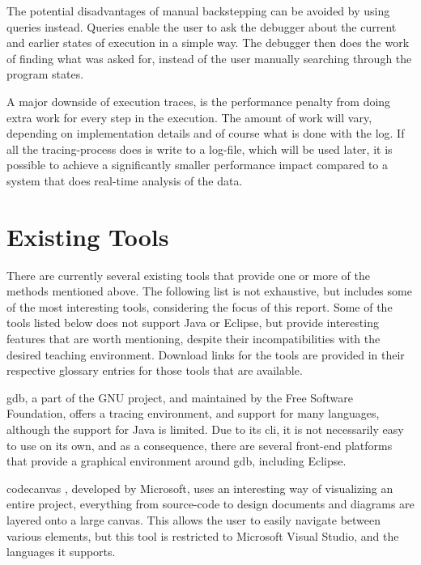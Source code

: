 The potential disadvantages of manual backstepping can be avoided by using queries instead.
Queries enable the user to ask the debugger about the current and earlier states of execution in a simple way.
The debugger then does the work of finding what was asked for, instead of the user manually searching through the program states.

A major downside of execution traces, is the performance penalty from doing extra work for every step in the execution.
The amount of work will vary, depending on implementation details and of course what is done with the log.
If all the tracing-process does is write to a log-file, which will be used later, it is possible to achieve a significantly smaller performance impact compared to a system that does real-time analysis of the data.

\section{Existing Tools}\label{PreTools}%

There are currently several existing tools that provide one or more of the methods mentioned above.
The following list is not exhaustive, but includes some of the most interesting tools, considering the focus of this report.
Some of the tools listed below does not support Java or Eclipse, but provide interesting features that are worth mentioning, despite their incompatibilities with the desired teaching environment.
Download links for the tools are provided in their respective glossary entries for those tools that are available.

\gls{gdb}, a part of the GNU project, and maintained by the Free Software Foundation, offers a tracing environment, and support for many languages, although the support for Java is limited.
Due to its \gls{cli}, it is not necessarily easy to use on its own, and as a consequence, there are several front-end platforms that provide a graphical environment around \gls{gdb}, including Eclipse.

\Gls{codecanvas} \cite{Deline2010}, developed by Microsoft, uses an interesting way of visualizing an entire project, everything from source-code to design documents and diagrams are layered onto a large canvas.
This allows the user to easily navigate between various elements, but this tool is restricted to Microsoft Visual Studio, and the languages it supports.

